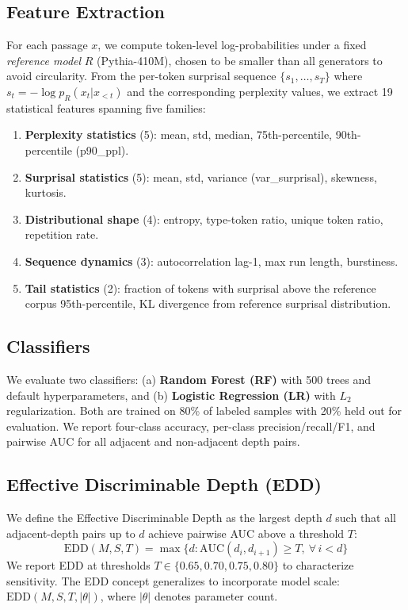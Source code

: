 \documentclass[11pt,a4paper]{article}
\newcommand{\edd}{\mathrm{EDD}}
\begin{document}
\subsection{Feature Extraction}
\label{sec:features}

For each passage $x$, we compute token-level log-probabilities under a fixed \emph{reference model} $R$ (Pythia-410M), chosen to be smaller than all generators to avoid circularity. From the per-token surprisal sequence $\{s_1, \ldots, s_T\}$ where $s_t = -\log p_R(x_t | x_{<t})$ and the corresponding perplexity values, we extract 19 statistical features spanning five families:

\begin{enumerate}
    \item \textbf{Perplexity statistics} (5): mean, std, median, 75th-percentile, 90th-percentile (p90\_ppl).
    \item \textbf{Surprisal statistics} (5): mean, std, variance (var\_surprisal), skewness, kurtosis.
    \item \textbf{Distributional shape} (4): entropy, type-token ratio, unique token ratio, repetition rate.
    \item \textbf{Sequence dynamics} (3): autocorrelation lag-1, max run length, burstiness.
    \item \textbf{Tail statistics} (2): fraction of tokens with surprisal above the reference corpus 95th-percentile, KL divergence from reference surprisal distribution.
\end{enumerate}

\subsection{Classifiers}

We evaluate two classifiers: (a) \textbf{Random Forest (RF)} with 500 trees and default hyperparameters, and (b) \textbf{Logistic Regression (LR)} with $L_2$ regularization. Both are trained on 80\% of labeled samples with 20\% held out for evaluation. We report four-class accuracy, per-class precision/recall/F1, and pairwise AUC for all adjacent and non-adjacent depth pairs.

\subsection{Effective Discriminable Depth (EDD)}

We define the Effective Discriminable Depth as the largest depth $d$ such that all adjacent-depth pairs up to $d$ achieve pairwise AUC above a threshold $T$:
\begin{equation}
    \edd(M, S, T) = \max\{d : \mathrm{AUC}(d_i, d_{i+1}) \geq T,\ \forall\, i < d\}
\end{equation}
We report EDD at thresholds $T \in \{0.65, 0.70, 0.75, 0.80\}$ to characterize sensitivity. The EDD concept generalizes to incorporate model scale: $\edd(M, S, T, |\theta|)$, where $|\theta|$ denotes parameter count.
\end{document}
